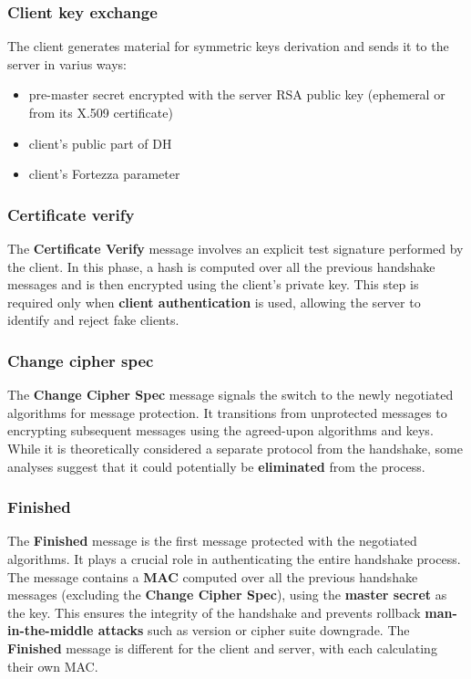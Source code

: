 \subsubsection{Client key exchange}

The client generates material for symmetric keys derivation and sends it to the server in varius ways:
\begin{itemize}
    \item pre-master secret encrypted with the server RSA public key
          (ephemeral or from its X.509 certificate)
    \item client's public part of DH
    \item client's Fortezza parameter
\end{itemize}

\subsubsection{Certificate verify}
The \textbf{Certificate Verify} message involves an explicit test signature performed by the client. In this phase, a hash is computed over all the previous handshake messages and is then encrypted using the client's private key. This step is required only when \textbf{client authentication} is used, allowing the server to identify and reject fake clients.

\subsubsection{Change cipher spec}
The \textbf{Change Cipher Spec} message signals the switch to the newly negotiated algorithms for message protection. It transitions from unprotected messages to encrypting subsequent messages using the agreed-upon algorithms and keys. \\ While it is theoretically considered a separate protocol from the handshake, some analyses suggest that it could potentially be \textbf{eliminated} from the process.

\subsubsection{Finished}

The \textbf{Finished} message is the first message protected with the negotiated algorithms. It plays a crucial role in authenticating the entire handshake process. \\ The message contains a \textbf{MAC} computed over all the previous handshake messages (excluding the \textbf{Change Cipher Spec}), using the \textbf{master secret} as the key. This ensures the integrity of the handshake and prevents rollback \textbf{man-in-the-middle attacks} such as version or cipher suite downgrade. The \textbf{Finished} message is different for the client and server, with each calculating their own MAC.


